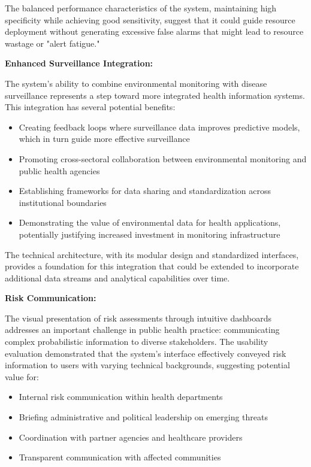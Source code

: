 \documentclass[12pt,a4paper]{report}
\begin{document}
The balanced performance characteristics of the system, maintaining high specificity while achieving good sensitivity, suggest that it could guide resource deployment without generating excessive false alarms that might lead to resource wastage or "alert fatigue."

\textbf{Enhanced Surveillance Integration:}

The system's ability to combine environmental monitoring with disease surveillance represents a step toward more integrated health information systems. This integration has several potential benefits:

\begin{itemize}
    \item Creating feedback loops where surveillance data improves predictive models, which in turn guide more effective surveillance
    \item Promoting cross-sectoral collaboration between environmental monitoring and public health agencies
    \item Establishing frameworks for data sharing and standardization across institutional boundaries
    \item Demonstrating the value of environmental data for health applications, potentially justifying increased investment in monitoring infrastructure
\end{itemize}

The technical architecture, with its modular design and standardized interfaces, provides a foundation for this integration that could be extended to incorporate additional data streams and analytical capabilities over time.

\textbf{Risk Communication:}

The visual presentation of risk assessments through intuitive dashboards addresses an important challenge in public health practice: communicating complex probabilistic information to diverse stakeholders. The usability evaluation demonstrated that the system's interface effectively conveyed risk information to users with varying technical backgrounds, suggesting potential value for:

\begin{itemize}
    \item Internal risk communication within health departments
    \item Briefing administrative and political leadership on emerging threats
    \item Coordination with partner agencies and healthcare providers
    \item Transparent communication with affected communities
\end{itemize}
\end{document}

